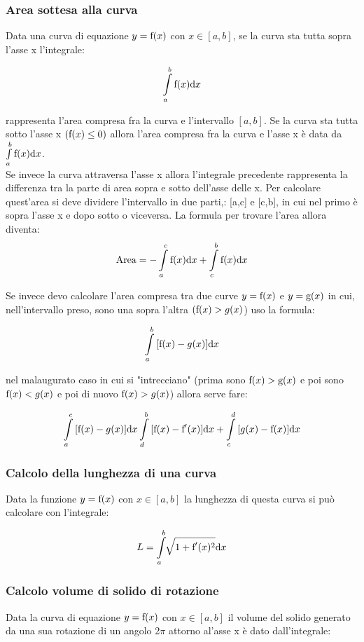	\subsubsection{Area sottesa alla curva}
	Data una curva di equazione $y=\text{\text{f}}(x)$ con $x\in [a,b]$, se la curva sta tutta sopra l'asse x l'integrale:
	
	\[
	\int\limits_a^b{\text{\text{f}}(x){\rm d}x}
	\]
	
	rappresenta l'area compresa fra la curva e l'intervallo $[a,b]$.
	Se la curva sta tutta sotto l'asse x 
	$(\text{\text{f}}(x)\leq0)$
	 allora l'area compresa fra la curva e l'asse x è data da 
	 $\int\limits_a^b{\text{\text{f}}(x){\rm d}x}$.\\
	 Se invece la curva attraversa l'asse x allora l'integrale precedente rappresenta la differenza tra la parte di area sopra e sotto dell'asse delle x. Per calcolare quest'area si deve dividere l'intervallo in due parti,: [a,c] e [c,b], in cui nel primo è sopra l'asse x e dopo sotto o viceversa. La formula per trovare l'area allora diventa:
	 \[
	\text{Area}=- \int\limits_a^c{\text{\text{f}}(x){\rm d}x}+\int\limits_c^b{\text{\text{f}}(x){\rm d}x}
	\]
	
Se invece devo calcolare l'area compresa tra due curve $y={\text{f}}(x)$ e $y={\text{g}}(x)$ in cui, nell'intervallo preso, sono una sopra l'altra $({\text{f}}(x)>g(x)$) uso la formula:

\[
\int\limits_a^b{[\text{\text{f}}(x)-g(x)]{\rm d}x}
\]

nel malaugurato caso in cui si "intrecciano" (prima sono $\text{f}(x)>\text{g}(x)$ e poi sono $\text{f}(x)<g(x)$ e poi di nuovo $\text{f}(x)>g(x)$) allora serve fare:

\[
\int\limits_a^c{[\text{\text{f}}(x)-g(x)]{\rm d}x}
\int\limits_d^b{[\text{\text{f}}(x)-\text{\text{f}}'(x)]{\rm d}x}+
\int\limits_c^d{[g(x)-\text{\text{f}}(x)]{\rm d}x}
\]

\subsubsection{Calcolo della lunghezza di una curva}
Data la funzione $y=\text{f}(x)$ con $x\in[a,b]$ la lunghezza di questa  curva si può calcolare con l'integrale:

\[
L=\int\limits_a^b{\sqrt[]{1+\text{\text{f}}'(x)^2}}{\rm d}x
\]

\subsubsection{Calcolo volume di solido di rotazione}
Data la curva di equazione $y=\text{\text{f}}(x)$ con $x\in [a,b]$ il volume del solido generato da una sua rotazione di un angolo 2$\pi$ attorno al'asse x è dato dall'integrale:

